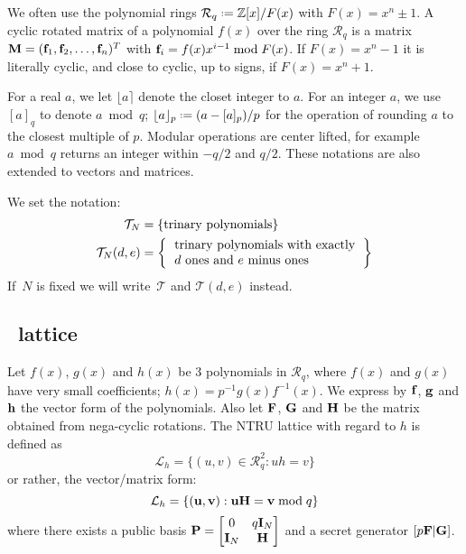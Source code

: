 \documentclass{llncs}
\newcommand{\Lcal}{{\mathcal L}}
\newcommand{\Rcal}{{\mathcal R}}
\newcommand{\Tcal}{{\mathcal T}}
\newcommand{\ZZ}{\mathbb{Z}}
\newcommand{\bff}{{\bf f}}
\newcommand{\bfg}{{\bf g}}
\newcommand{\bfh}{{\bf h}}
\newcommand{\bfu}{{\bf u}}
\newcommand{\bfv}{{\bf v}}
\newcommand{\bfF}{{\bf F}}
\newcommand{\bfG}{{\bf G}}
\newcommand{\bfH}{{\bf H}}
\newcommand{\bfI}{{\bf I}}
\newcommand{\bfM}{{\bf M}}
\newcommand{\ntru}{{\sf{NTRU}}}
\newcommand{\<}{\langle}
\renewcommand{\>}{\rangle}
\newcommand*{\defeq}{\mathrel{\vcenter{\baselineskip0.5ex \lineskiplimit0pt
                     \hbox{\scriptsize.}\hbox{\scriptsize.}}}%
                     =}
\begin{document}
We often use the polynomial rings $\Rcal_q \defeq \ZZ[x]/F(x)$ with $F(x) = x^n\pm 1$. %
A cyclic rotated matrix of a polynomial $f(x)$ over the ring $\Rcal_q$
is a matrix $\bfM = (\bff_1,\bff_2,\dots,\bff_n)^T$ with $\bff_i = f(x)x^{i-1}\bmod F(x)$.
If  $F(x) = x^n- 1$ it is literally cyclic, and close to cyclic, up to signs, if $F(x) = x^n + 1$.

For a real $a$, we let 
$\lfloor a\rceil$ denote the closet integer to $a$.
 For an integer $a$, we use
$[a]_q$ to denote $a\bmod q$; $\lfloor a\rfloor_p \defeq (a - [a]_p )/p$ for the operation of rounding $a$ to the closest multiple of $p$. 
Modular operations are center lifted, for example $a\bmod q$ returns an integer within $-q/2$ and $q/2$. These notations are also extended to vectors and matrices.





We set the notation:
\begin{align*}
  \Tcal_N&=\left\{\text{trinary polynomials}\right\}\\
  \Tcal_N(d,e)&=\left\{
        \begin{tabular}{l}
        trinary polynomials with exactly\\ 
        $d$ ones and $e$ minus ones\\
        \end{tabular}
      \right\}
\end{align*}
If~$N$ is fixed we will write~$\Tcal$ and $\Tcal(d,e)$ instead.

\subsection{\ntru~lattice}
Let $f(x)$, $g(x)$ and $h(x)$ be $3$ polynomials in $\Rcal_q$,
where $f(x)$ and $g(x)$ have very small coefficients; $h(x) = p^{-1}g(x)f^{-1}(x)$.  We express by
$\bff$, $\bfg$  and  $\bfh$ the vector form of the polynomials. Also let $\bfF$, $\bfG$ and  $\bfH$ be the matrix  obtained from 
nega-cyclic rotations.
The NTRU lattice with regard to $h$ is defined as 
\[
\Lcal_h = \{(u,v) \in \Rcal_q^2: uh = v\}
\]
or rather, the vector/matrix form:
\[
\Lcal_h = \{(\bfu,\bfv): \bfu\bfH = \bfv \bmod q\}
\]
where there exists a public basis
$\bf P  = \begin{bmatrix}
0& q\bfI_N \\
\bfI_N& \bfH 
\end{bmatrix}
$
and a secret generator
$
[p\bfF|\bfG]
$. %
\end{document}
